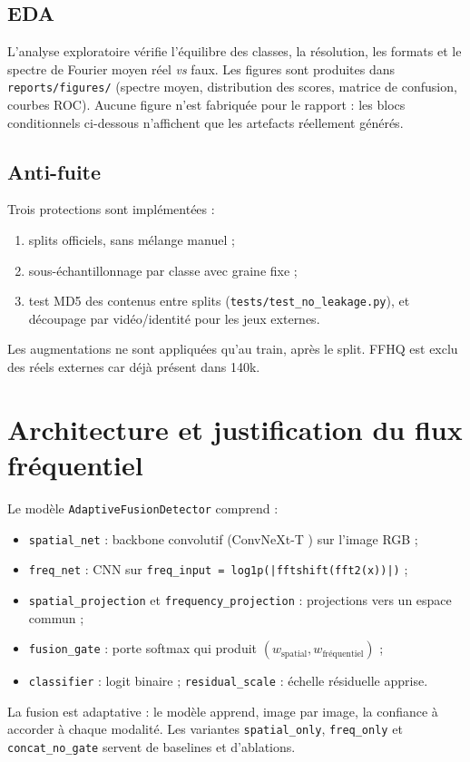 \documentclass[11pt,a4paper]{article}
\begin{document}
\subsection{EDA}
L'analyse exploratoire vérifie l'équilibre des classes, la résolution, les
formats et le spectre de Fourier moyen réel \textit{vs} faux. Les figures sont
produites dans \texttt{reports/figures/} (spectre moyen, distribution des scores,
matrice de confusion, courbes ROC). Aucune figure n'est fabriquée pour le
rapport : les blocs conditionnels ci-dessous n'affichent que les artefacts
réellement générés.

\subsection{Anti-fuite}
Trois protections sont implémentées :
\begin{enumerate}[nosep]
  \item splits officiels, sans mélange manuel ;
  \item sous-échantillonnage par classe avec graine fixe ;
  \item test MD5 des contenus entre splits (\texttt{tests/test\_no\_leakage.py}),
        et découpage par vidéo/identité pour les jeux externes.
\end{enumerate}
Les augmentations ne sont appliquées qu'au train, après le split. FFHQ est exclu
des réels externes car déjà présent dans 140k.

\section{Architecture et justification du flux fréquentiel}
Le modèle \texttt{AdaptiveFusionDetector} comprend :
\begin{itemize}[nosep]
  \item \texttt{spatial\_net} : backbone convolutif (ConvNeXt-T \cite{liu2022convnext})
        sur l'image RGB ;
  \item \texttt{freq\_net} : CNN sur \texttt{freq\_input = log1p(|fftshift(fft2(x))|)} ;
  \item \texttt{spatial\_projection} et \texttt{frequency\_projection} : projections
        vers un espace commun ;
  \item \texttt{fusion\_gate} : porte softmax qui produit
        $(w_{\text{spatial}}, w_{\text{fréquentiel}})$ ;
  \item \texttt{classifier} : logit binaire ; \texttt{residual\_scale} : échelle
        résiduelle apprise.
\end{itemize}
La fusion est adaptative : le modèle apprend, image par image, la confiance à
accorder à chaque modalité. Les variantes \texttt{spatial\_only},
\texttt{freq\_only} et \texttt{concat\_no\_gate} servent de baselines et
d'ablations.
\end{document}
